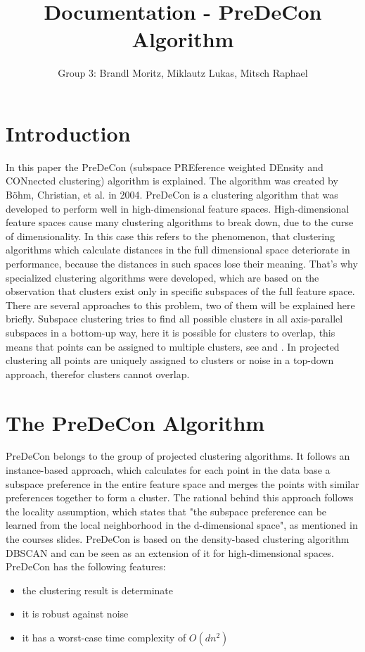 \documentclass[a4paper]{article}
\title{Documentation - PreDeCon Algorithm }
\author{Group 3: Brandl Moritz, Miklautz Lukas, Mitsch Raphael}
\begin{document}
\maketitle


\section{Introduction}
In this paper the PreDeCon (subspace PREference weighted DEnsity and CONnected clustering) algorithm is explained. The algorithm was created by B\"ohm, Christian, et al.\cite{bohm2004density}  in 2004. PreDeCon  is a clustering algorithm that was developed to perform well in high-dimensional feature spaces. High-dimensional feature spaces cause many clustering algorithms to break down, due to the curse of dimensionality. In this case this refers to the phenomenon, that clustering algorithms which calculate  distances in the full dimensional space deteriorate in performance, because the distances in such spaces lose their meaning. That's why specialized clustering algorithms were developed, which are based on the observation that clusters exist only in specific subspaces of the full feature space. There are several approaches to this problem, two of them will be explained here briefly. Subspace clustering tries to find all possible clusters in all axis-parallel subspaces in a bottom-up way, here it is possible for clusters to overlap, this means that points can be assigned to multiple clusters, see \cite{agrawal1998automatic} and \cite{kailing2004density}. In projected clustering all points are uniquely assigned to clusters or noise in a top-down approach, therefor clusters cannot overlap. 

\section{The PreDeCon Algorithm}
PreDeCon belongs to the group of projected clustering algorithms. It follows an instance-based approach, which calculates for each point in the data base a subspace preference in the entire feature space and merges the points with similar preferences together to form a cluster. 
The rational behind this approach follows the locality assumption, which states that "the subspace preference can be learned from the local neighborhood in the d-dimensional space", as mentioned in the courses slides.
PreDeCon is based on the density-based clustering algorithm DBSCAN \cite{ester1996density} and can be seen as an extension of it for high-dimensional spaces. 
PreDeCon has the following features\cite{bohm2004density}:
\begin{itemize}
\item the clustering result is determinate
\item it is robust against noise
\item it has a worst-case time complexity of $O(dn^2)$
\end{itemize}
\end{document}
